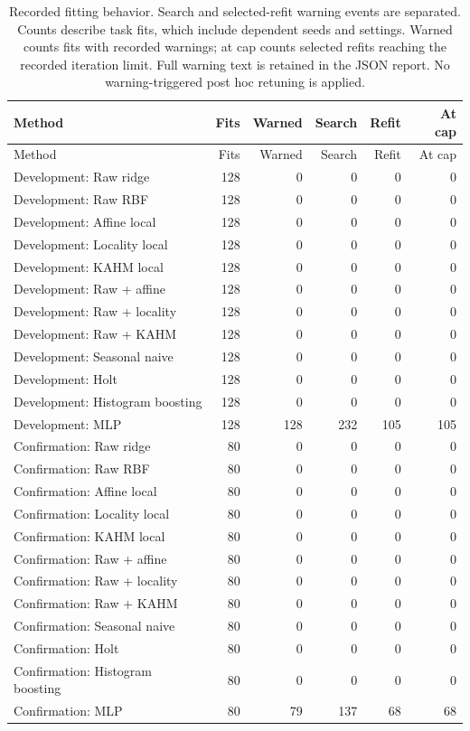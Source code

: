{\small\setlength{\tabcolsep}{4pt}
\begin{longtable}{lrrrrr}
\caption{Recorded fitting behavior. Search and selected-refit warning events are separated. Counts describe task fits, which include dependent seeds and settings. Warned counts fits with recorded warnings; at cap counts selected refits reaching the recorded iteration limit. Full warning text is retained in the JSON report. No warning-triggered post hoc retuning is applied.}\label{tab:fit-warnings}\\
\toprule
Method & Fits & Warned & Search & Refit & At cap \\
\midrule
\endfirsthead
\toprule
Method & Fits & Warned & Search & Refit & At cap \\
\midrule
\endhead
Development: Raw ridge & 128 & 0 & 0 & 0 & 0 \\
Development: Raw RBF & 128 & 0 & 0 & 0 & 0 \\
Development: Affine local & 128 & 0 & 0 & 0 & 0 \\
Development: Locality local & 128 & 0 & 0 & 0 & 0 \\
Development: KAHM local & 128 & 0 & 0 & 0 & 0 \\
Development: Raw + affine & 128 & 0 & 0 & 0 & 0 \\
Development: Raw + locality & 128 & 0 & 0 & 0 & 0 \\
Development: Raw + KAHM & 128 & 0 & 0 & 0 & 0 \\
Development: Seasonal naive & 128 & 0 & 0 & 0 & 0 \\
Development: Holt & 128 & 0 & 0 & 0 & 0 \\
Development: Histogram boosting & 128 & 0 & 0 & 0 & 0 \\
Development: MLP & 128 & 128 & 232 & 105 & 105 \\
Confirmation: Raw ridge & 80 & 0 & 0 & 0 & 0 \\
Confirmation: Raw RBF & 80 & 0 & 0 & 0 & 0 \\
Confirmation: Affine local & 80 & 0 & 0 & 0 & 0 \\
Confirmation: Locality local & 80 & 0 & 0 & 0 & 0 \\
Confirmation: KAHM local & 80 & 0 & 0 & 0 & 0 \\
Confirmation: Raw + affine & 80 & 0 & 0 & 0 & 0 \\
Confirmation: Raw + locality & 80 & 0 & 0 & 0 & 0 \\
Confirmation: Raw + KAHM & 80 & 0 & 0 & 0 & 0 \\
Confirmation: Seasonal naive & 80 & 0 & 0 & 0 & 0 \\
Confirmation: Holt & 80 & 0 & 0 & 0 & 0 \\
Confirmation: Histogram boosting & 80 & 0 & 0 & 0 & 0 \\
Confirmation: MLP & 80 & 79 & 137 & 68 & 68 \\
\bottomrule
\end{longtable}
}


